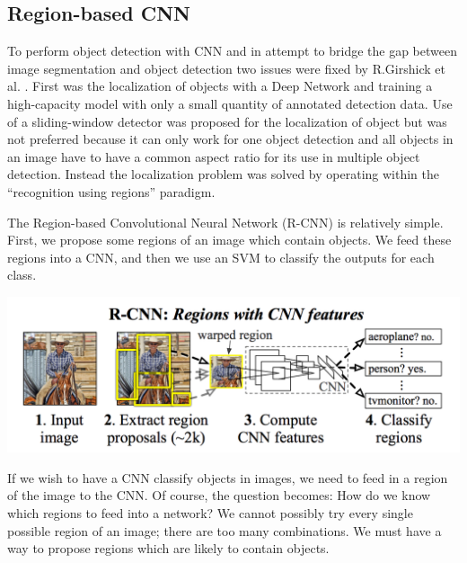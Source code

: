 \subsection{Region-based CNN}\label{s:nnevo-rcnn}

To perform object detection with CNN and in attempt to bridge the gap between image segmentation and object detection two issues were fixed by R.Girshick et al. \cite{Girshick_2014}. First was the localization of objects with a Deep Network and training a high-capacity model with only a small quantity of annotated detection data. Use of a sliding-window detector was proposed for the localization of object but was not preferred because it can only work for one object detection and all objects in an image have to have a common aspect ratio for its use in multiple object detection. Instead the localization problem was solved by operating within the “recognition using regions” paradigm.

The Region-based Convolutional Neural Network (R-CNN) is relatively simple. First, we propose some regions of an image which contain objects. We feed these regions into a CNN, and then we use an SVM to classify the outputs for each class.

\begin{center}
	\includegraphics[scale=0.3]{images/rcnn.png}
\end{center}

If we wish to have a CNN classify objects in images, we need to feed in a region of the image to the CNN. Of course, the question becomes: How do we know which regions to feed into a network? We cannot possibly try every single possible region of an image; there are too many combinations. We must have a way to propose regions which are likely to contain objects.

